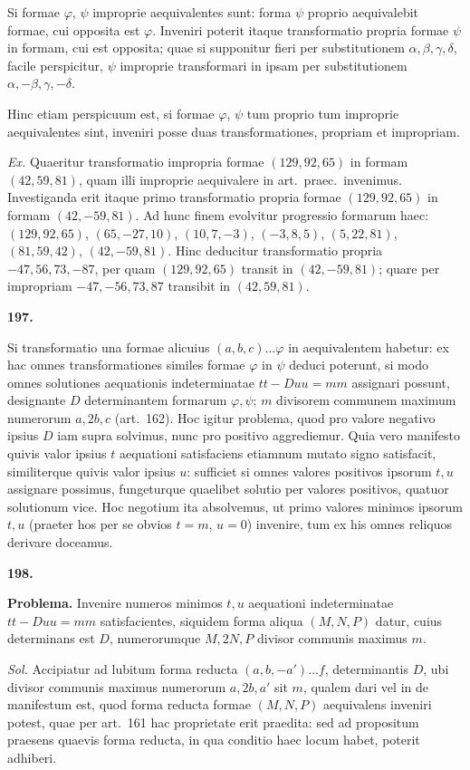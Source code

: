 \documentclass[12pt,a4paper]{article}
\theoremstyle{plain}
\theoremstyle{definition}
\theoremstyle{remark}
\begin{document}
Si formae $\varphi$, $\psi$ improprie aequivalentes sunt: forma $\psi$ proprio aequivalebit formae, cui opposita est $\varphi$. Inveniri poterit itaque transformatio propria formae $\psi$ in formam, cui est opposita; quae si supponitur fieri per substitutionem $\alpha,\beta,\gamma,\delta$, facile perspicitur, $\psi$ improprie transformari in ipsam per substitutionem $\alpha,-\beta,\gamma,-\delta$.

Hinc etiam perspicuum est, si formae $\varphi$, $\psi$ tum proprio tum improprie aequivalentes sint, inveniri posse duas transformationes, propriam et impropriam.

\textit{Ex.} Quaeritur transformatio impropria formae $(129,92,65)$ in formam $(42,59,81)$, quam illi improprie aequivalere in art.\ praec.\ invenimus. Investiganda erit itaque primo transformatio propria formae $(129,92,65)$ in formam $(42,-59,81)$. Ad hunc finem evolvitur progressio formarum haec: $(129,92,65)$, $(65,-27,10)$, $(10,7,-3)$, $(-3,8,5)$, $(5,22,81)$, $(81,59,42)$, $(42,-59,81)$. Hinc deducitur transformatio propria $-47,56,73,-87$, per quam $(129,92,65)$ transit in $(42,-59,81)$; quare per impropriam $-47,-56,73,87$ transibit in $(42,59,81)$.

\textbf{197.}

Si transformatio una formae alicuius $(a,b,c)\ldots\varphi$ in aequivalentem habetur: ex hac omnes transformationes similes formae $\varphi$ in $\psi$ deduci poterunt, si modo omnes solutiones aequationis indeterminatae $tt-Duu=mm$ assignari possunt, designante $D$ determinantem formarum $\varphi,\psi$; $m$ divisorem communem maximum numerorum $a,2b,c$ (art.\ 162). Hoc igitur problema, quod pro valore negativo ipsius $D$ iam supra solvimus, nunc pro positivo aggrediemur. Quia vero manifesto quivis valor ipsius $t$ aequationi satisfaciens etiamnum mutato signo satisfacit, similiterque quivis valor ipsius $u$: sufficiet si omnes valores positivos ipsorum $t,u$ assignare possimus, fungeturque quaelibet solutio per valores positivos, quatuor solutionum vice. Hoc negotium ita absolvemus, ut primo valores minimos ipsorum $t,u$ (praeter hos per se obvios $t=m$, $u=0$) invenire, tum ex his omnes reliquos derivare doceamus.

\textbf{198.}

\textbf{Problema.} Invenire numeros minimos $t,u$ aequationi indeterminatae $tt-Duu=mm$ satisfacientes, siquidem forma aliqua $(M,N,P)$ datur, cuius determinans est $D$, numerorumque $M,2N,P$ divisor communis maximus $m$.

\textit{Sol.} Accipiatur ad lubitum forma reducta $(a,b,-a')\ldots f$, determinantis $D$, ubi divisor communis maximus numerorum $a,2b,a'$ sit $m$, qualem dari vel in de manifestum est, quod forma reducta formae $(M,N,P)$ aequivalens inveniri potest, quae per art.\ 161 hac proprietate erit praedita: sed ad propositum praesens quaevis forma reducta, in qua conditio haec locum habet, poterit adhiberi.
\end{document}
